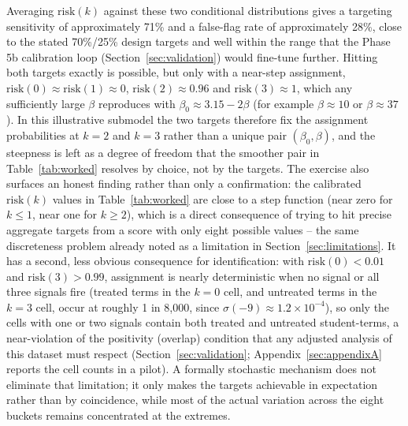 \documentclass[11pt]{article}
\begin{document}
Averaging $\text{risk}(k)$ against these two conditional distributions gives a targeting sensitivity of approximately 71\% and a false-flag rate of approximately 28\%, close to the stated 70\%/25\% design targets and well within the range that the Phase 5b calibration loop (Section~\ref{sec:validation}) would fine-tune further. Hitting both targets exactly is possible, but only with a near-step assignment, $\text{risk}(0) \approx \text{risk}(1) \approx 0$, $\text{risk}(2) \approx 0.96$ and $\text{risk}(3) \approx 1$, which any sufficiently large $\beta$ reproduces with $\beta_0 \approx 3.15 - 2\beta$ (for example $\beta \approx 10$ or $\beta \approx 37$). In this illustrative submodel the two targets therefore fix the assignment probabilities at $k=2$ and $k=3$ rather than a unique pair $(\beta_0,\beta)$, and the steepness is left as a degree of freedom that the smoother pair in Table~\ref{tab:worked} resolves by choice, not by the targets. The exercise also surfaces an honest finding rather than only a confirmation: the calibrated $\text{risk}(k)$ values in Table~\ref{tab:worked} are close to a step function (near zero for $k \le 1$, near one for $k \ge 2$), which is a direct consequence of trying to hit precise aggregate targets from a score with only eight possible values -- the same discreteness problem already noted as a limitation in Section~\ref{sec:limitations}. It has a second, less obvious consequence for identification: with $\text{risk}(0) < 0.01$ and $\text{risk}(3) > 0.99$, assignment is nearly deterministic when no signal or all three signals fire (treated terms in the $k=0$ cell, and untreated terms in the $k=3$ cell, occur at roughly 1 in 8,000, since $\sigma(-9) \approx 1.2 \times 10^{-4}$), so only the cells with one or two signals contain both treated and untreated student-terms, a near-violation of the positivity (overlap) condition that any adjusted analysis of this dataset must respect (Section~\ref{sec:validation}; Appendix~\ref{sec:appendixA} reports the cell counts in a pilot). A formally stochastic mechanism does not eliminate that limitation; it only makes the targets achievable in expectation rather than by coincidence, while most of the actual variation across the eight buckets remains concentrated at the extremes.
\end{document}
